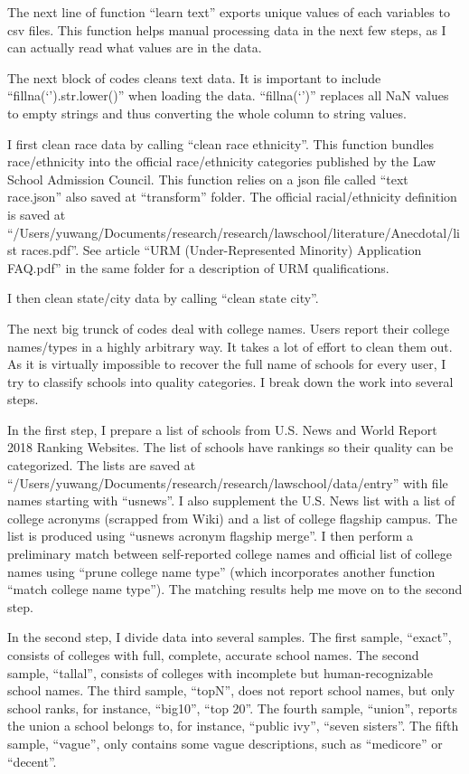\documentclass[12pt]{article}
\begin{document}
The next line of function ``learn text'' exports unique values of each variables to csv files. This function helps manual processing data in the next few steps, as I can actually read what values are in the data. 

The next block of codes cleans text data. It is important to include ``fillna(`').str.lower()'' when loading the data. ``fillna(`')'' replaces all NaN values to empty strings and thus converting the whole column to string values. 

I first clean race data by calling ``clean race ethnicity''. This function bundles race/ethnicity into the official race/ethnicity categories published by the Law School Admission Council. This function relies on a json file called ``text race.json'' also saved at ``transform'' folder. The official racial/ethnicity definition is saved at ``/Users/yuwang/Documents/research/research/lawschool/literature/Anecdotal/list races.pdf''. See article ``URM (Under-Represented Minority) Application FAQ.pdf'' in the same folder for a description of URM qualifications. 

I then clean state/city data by calling ``clean state city''. 

The next big trunck of codes deal with college names. Users report their college names/types in a highly arbitrary way. It takes a lot of effort to clean them out. As it is virtually impossible to recover the full name of schools for every user, I try to classify schools into quality categories. I break down the work into several steps. 

In the first step, I prepare a list of schools from U.S. News and World Report 2018 Ranking Websites. The list of schools have rankings so their quality can be categorized. The lists are saved at ``/Users/yuwang/Documents/research/research/lawschool/data/entry'' with file names starting with ``usnews''. I also supplement the U.S. News list with a list of college acronyms (scrapped from Wiki) and a list of college flagship campus. The list is produced using ``usnews acronym flagship merge''. I then perform a preliminary match between self-reported college names and official list of college names using ``prune college name type'' (which incorporates another function ``match college name type''). The matching results help me move on to the second step. 

In the second step, I divide data into several samples. The first sample, ``exact'', consists of colleges with full, complete, accurate school names. The second sample, ``tallal'', consists of colleges with incomplete but human-recognizable school names. The third sample, ``topN'', does not report school names, but only school ranks, for instance, ``big10'', ``top 20''. The fourth sample, ``union'', reports the union a school belongs to, for instance, ``public ivy'', ``seven sisters''. The fifth sample, ``vague'', only contains some vague descriptions, such as ``medicore'' or ``decent''. 
\end{document}
